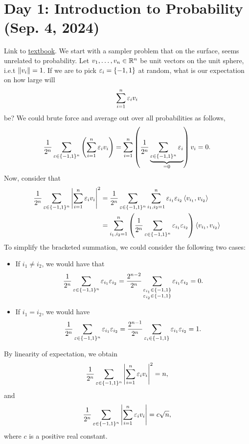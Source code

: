 \section{Day 1: Introduction to Probability (Sep. 4, 2024)}
Link to \href{https://drive.google.com/file/d/1Rpkr-NCEyqygvypR65RznaZkb36KHB29/view}{textbook}.
\medskip\newline
We start with a sampler problem that on the surface, seems unrelated to probability. Let $v_1, \dots, v_n \in \mathbb R^n$ be unit vectors on the unit sphere, i.e.t $\left\lVert v_i \right\rVert = 1$. If we are to pick $\varepsilon_i = \{-1, 1\}$ at random, what is our expectation on how large will
\[ \sum_{i=1}^n \varepsilon_i v_i \]
be? We could brute force and average out over all probabilities as follows,
\[ \frac{1}{2^n} \sum_{\varepsilon \in \{-1, 1\}^n} \left(\sum_{i=1}^n \varepsilon_i v_i \right) = \sum_{i=1}^n \left(\frac{1}{2^n} \underbrace{\sum_{\varepsilon \in \{-1, 1\}^n} \varepsilon_i}_{=0} \right) v_i = 0. \]
Now, consider that
\begin{align*}
    \frac{1}{2^n} \sum_{\varepsilon \in \{-1, 1\}^n} \left\lvert \sum_{i=1}^n \varepsilon_i v_i \right\rvert^2 &= \frac{1}{2^n} \sum_{\varepsilon \in \{-1, 1\}^n} \sum_{i_1, i_2 = 1}^n \varepsilon_{i_1} \varepsilon_{i_2} \left< v_{i_1}, v_{i_2} \right> \\
    &= \sum_{i_1, i_2 = 1}^n \left(\frac{1}{2^n} \sum_{\varepsilon \in \{-1, 1\}^n} \varepsilon_{i_1} \varepsilon_{i_2} \right) \left< v_{i_1}, v_{i_2} \right>
\end{align*}
To simplify the bracketed summation, we could consider the following two cases:
\begin{itemize}
    \item If $i_1 \neq i_2$, we would have that
    \[ \frac{1}{2^n} \sum_{\varepsilon \in \{-1, 1\}^n} \varepsilon_{i_1} \varepsilon_{i_2} = \frac{2^{n-2}}{2^n} \sum_{\substack{\varepsilon_{i_1} \in \{-1, 1\} \\ \varepsilon_{i_2} \in \{-1, 1\}}} \varepsilon_{i_1} \varepsilon_{i_2} = 0. \]
    \item If $i_1 = i_2$, we would have
    \[ \frac{1}{2^n} \sum_{\varepsilon \in \{-1, 1\}^n} \varepsilon_{i_1} \varepsilon_{i_2} = \frac{2^{n-1}}{2^n} \sum_{\varepsilon_i \in \{-1, 1\}} \varepsilon_{i_1} \varepsilon_{i_2} = 1. \]
\end{itemize}
By linearity of expectation, we obtain
\[ \frac{1}{2^n} \sum_{\varepsilon \in \{-1, 1\}^n} \left\lvert \sum_{i=1}^n \varepsilon_i v_i \right\rvert^2 = n, \]
and
\[ \frac{1}{2^n} \sum_{\varepsilon \in \{-1, 1\}^n} \left\lvert \sum_{i=1}^n \varepsilon_i v_i \right\rvert = c\sqrt{n}, \]
where $c$ is a positive real constant.

